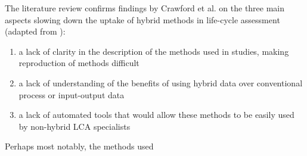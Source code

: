 \documentclass{article}
\begin{document}
        The literature review confirms findings by Crawford et al. on the three main aspects slowing down the uptake of hybrid methods in life-cycle assessment (adapted from \cite{crawford_hybrid_2018}):
        
        \begin{enumerate}[nosep]
            \item a lack of clarity in the description of the methods used in studies, making reproduction of methods difficult
            \item a lack of understanding of the benefits of using hybrid data over conventional process or input-output data
            \item a lack of automated tools that would allow these methods to be easily used by non-hybrid LCA specialists
        \end{enumerate}

        Perhaps most notably, the methods used 
        
\end{document}
